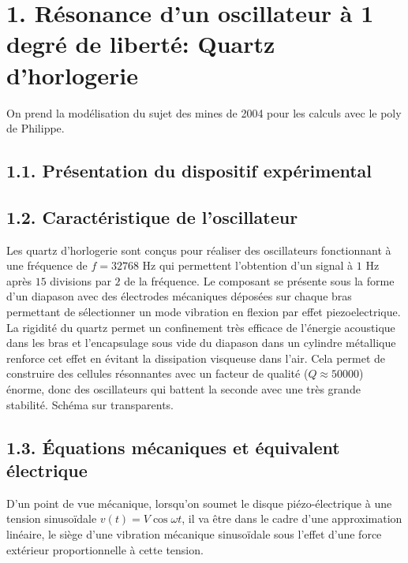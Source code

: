 \documentclass[french, a4paper, 10pt, twocolumn, landscape]{article}
\begin{document}

\section*{1. Résonance d'un oscillateur à 1 degré de liberté: Quartz d'horlogerie}

On prend la modélisation du sujet des mines de 2004 pour les calculs avec le poly de Philippe.

\subsection*{1.1. Présentation du dispositif expérimental}


\subsection*{1.2. Caractéristique de l'oscillateur }


Les quartz d'horlogerie sont conçus pour réaliser des oscillateurs fonctionnant à une fréquence de $f=32768$ Hz qui permettent l'obtention d'un signal à $1$ Hz après $15$ divisions par $2$ de la fréquence. Le composant se présente sous la forme d'un diapason avec des électrodes mécaniques déposées sur chaque bras permettant de sélectionner un mode vibration en flexion par effet piezoelectrique. La rigidité du quartz permet un confinement très efficace de l’énergie acoustique dans les bras et
l’encapsulage sous vide du diapason dans un cylindre métallique renforce cet effet en évitant la
dissipation visqueuse dans l’air. Cela permet de construire des cellules résonnantes avec un facteur
de qualité ($Q\approx 50 000$) énorme, donc des oscillateurs qui battent la seconde avec une très grande stabilité. Schéma sur transparents.

\subsection*{1.3. Équations mécaniques et équivalent électrique}

D'un point de vue mécanique, lorsqu'on soumet le disque piézo-électrique à une tension sinusoïdale $v(t) = V\cos{\omega t}$, il va être dans le cadre d'une approximation linéaire, le siège d'une vibration mécanique sinusoïdale sous l'effet d'une force extérieur proportionnelle à cette tension.
\end{document}
